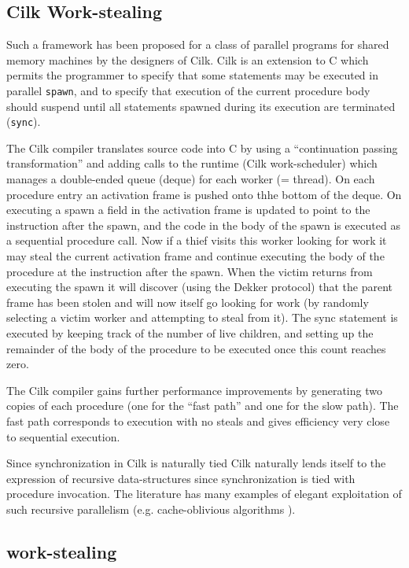 \subsection{Cilk Work-stealing}

Such a framework has been proposed for a class of parallel programs 
for shared memory machines by
the designers of Cilk. Cilk is an extension to C which permits the
programmer to specify that some statements may be executed in parallel
{\tt spawn}, and to specify that execution of the current procedure
body should suspend until all statements spawned during its execution
are terminated ({\tt sync}).

The Cilk compiler translates source code into C by using a
``continuation passing transformation'' and adding calls to the
runtime (Cilk work-scheduler) which manages a double-ended queue
(deque) for each worker (= thread). On each procedure entry an
activation frame is pushed onto thhe bottom of the deque. On executing
a spawn a field in the activation frame is updated to point to the
instruction after the spawn, and the code in the body of the spawn is
executed as a sequential procedure call. Now if a thief visits this
worker looking for work it may steal the current activation frame and
continue executing the body of the procedure at the instruction after
the spawn. When the victim returns from executing the spawn it will
discover (using the Dekker protocol) that the parent frame has been
stolen and will now itself go looking for work (by randomly selecting
a victim worker and attempting to steal from it). The sync statement
is executed by keeping track of the number of live children, and
setting up the remainder of the body of the procedure to be executed
once this count reaches zero. 

The Cilk compiler gains further performance improvements by generating
two copies of each procedure (one for the ``fast path'' and one for
the slow path). The fast path corresponds to execution with no steals
and gives efficiency very close to sequential execution.

Since synchronization in Cilk is naturally tied 
Cilk naturally lends itself to the expression of recursive
data-structures since synchronization is tied with procedure
invocation. The literature has many examples of elegant exploitation
of such recursive parallelism (e.g.{} cache-oblivious algorithms
\cite{frigo}). 

\subsection{\Xten{} work-stealing}

